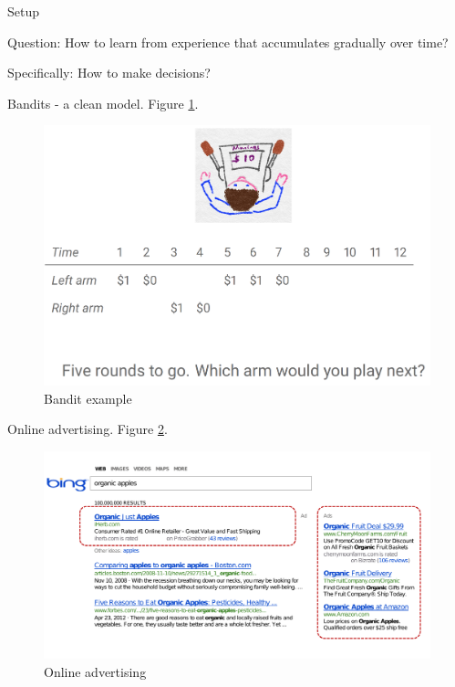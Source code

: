 \documentclass[english]{article}
\begin{document}
\benum

\item {Setup}
\bitem
\item Question: How to learn from experience that accumulates gradually over time?

\item Specifically: How to make decisions?

\eitem




\item {Bandits - a clean model}. Figure \ref{band_ex}.
\begin{figure}[h!]
\begin{center}
\includegraphics[width=0.4\paperwidth]{bandits}
    \caption{Bandit example}
    \label{band_ex}
\end{center}
\end{figure}



\item {Online advertising}. Figure \ref{online_ad}.
\begin{figure}[h!]
\begin{center}
\includegraphics[width=0.5\paperwidth]{online_ad}
    \caption{Online advertising}
    \label{online_ad}
\end{center}
\end{figure}
\end{document}
